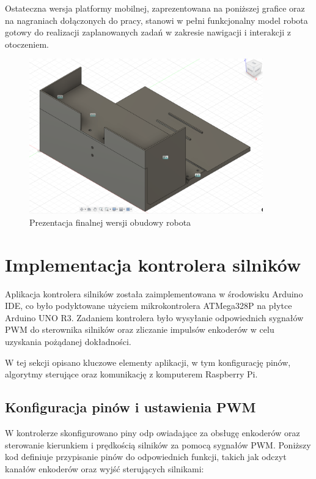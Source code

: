 Ostateczna wersja platformy mobilnej, zaprezentowana na poniższej grafice oraz na nagraniach dołączonych do pracy, stanowi w pełni funkcjonalny model robota gotowy do realizacji zaplanowanych zadań w zakresie nawigacji i interakcji z otoczeniem.

\begin{figure}[H]
  \centering
  \includegraphics[width=0.9\textwidth]{./graf/full.png}
  \caption{Prezentacja finalnej wersji obudowy robota}
  \label{fig:full}
\end{figure}
 
\clearpage

\section{Implementacja kontrolera silników}

Aplikacja kontrolera silników została zaimplementowana w środowisku Arduino IDE, co było podyktowane użyciem mikrokontrolera ATMega328P na płytce Arduino UNO R3. Zadaniem kontrolera było wysyłanie odpowiednich sygnałów PWM do sterownika silników oraz zliczanie impulsów enkoderów w celu uzyskania pożądanej dokładności. 

W tej sekcji opisano kluczowe elementy aplikacji, w tym konfigurację pinów, algorytmy sterujące oraz komunikację z komputerem Raspberry Pi.

\subsection{Konfiguracja pinów i ustawienia PWM}

W kontrolerze skonfigurowano piny odp owiadające za obsługę enkoderów oraz sterowanie kierunkiem i prędkością silników za pomocą sygnałów PWM. Poniższy kod definiuje przypisanie pinów do odpowiednich funkcji, takich jak odczyt kanałów enkoderów oraz wyjść sterujących silnikami:

